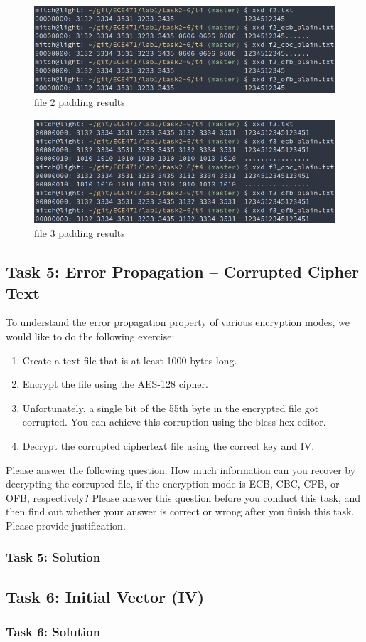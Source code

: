 \documentclass[12pt]{article}
\newcommand\tab[1][0.5cm]{\hspace*{#1}}
\begin{document}
\begin{figure}[H]
    \begin{center}
        \includegraphics[scale=0.62]{t4p4.png}
    \end{center}{}
    \caption{file 2 padding results}
    \label{fig:t4p4}
\end{figure}


\begin{figure}[H]
    \begin{center}
        \includegraphics[scale=0.62]{t4p5.png}
    \end{center}{}
    \caption{file 3 padding results}
    \label{fig:t4p5}
\end{figure}



\clearpage
\subsection{Task 5: Error Propagation – Corrupted Cipher Text}
To understand the error propagation property of various encryption modes, we would like to do the
following exercise:
\begin{enumerate}
    \item Create a text file that is at least 1000 bytes long.
    \item Encrypt the file using the AES-128 cipher.
    \item Unfortunately, a single bit of the 55th byte in the encrypted file got corrupted. You can
    achieve this corruption using the bless hex editor.
    \item Decrypt the corrupted ciphertext file using the correct key and IV.
\end{enumerate}
\tab Please answer the following question: How much information can you recover by decrypting the
corrupted file, if the encryption mode is ECB, CBC, CFB, or OFB, respectively? Please answer this
question before you conduct this task, and then find out whether your answer is correct or wrong after
you finish this task. Please provide justification.

\subsubsection{Task 5: Solution}

\subsection{Task 6: Initial Vector (IV)}
\subsubsection{Task 6: Solution}
\end{document}

